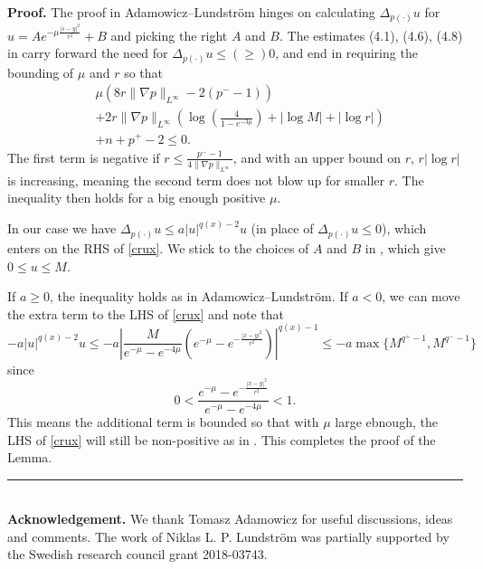 \documentclass[12pt]{article}
\newenvironment{proof}[1][Proof]{\textbf{#1.} }{\ \rule{0.5em}{0.5em}}
\numberwithin{komcounter}{section}
\begin{document}
\noindent
\begin{proof}
The proof in Adamowicz--Lundstr\"om \cite[Lemma 4.1]{AL16} hinges on calculating $\Delta_{p(\cdot)} u$ for $u = A  e^{-\mu \frac{|s-y|^2}{r^2}} + B$ and picking the right $A$ and $B$. The estimates (4.1), (4.6), (4.8) in \cite{AL16} carry forward the need for $\Delta_{p(\cdot)} u \leq (\geq) 0$, and end in requiring the bounding of $\mu$ and $r$ so that
%
\begin{align}\label{crux}
\nonumber &\mu ( 8r\|\nabla p\|_{L^\infty} - 2(p^- - 1)) \\
&+ 2r \|\nabla p\|_{L^\infty} \left( \log \left( \frac{4}{1-e^{-3\mu}}\right)  + |\log M| + |\log r| \right) \\
\nonumber &+ n + p^+ - 2 \leq 0.
\end{align}
%
The first term is negative if $r \leq \frac{p^- - 1}{4\|\nabla p\|_{L^\infty}}$, and with an upper bound on $r$, $r |\log r|$ is increasing, meaning the second term does not blow up for smaller $r$. The inequality then holds for a big enough positive $\mu$.

In our case we have $\Delta_{p(\cdot)} u \leq a |u|^{q(x) - 2} u$  (in place of $\Delta_{p(\cdot)} u \leq 0$),
which enters on the RHS of \eqref{crux}.
We stick to the choices of $A$ and $B$ in \cite{AL16},
which give $0 \leq u \leq M$.

If $a \geq 0$, the inequality holds as in Adamowicz--Lundstr\"om.
%
If $a < 0$, we can move the extra term to the LHS of \eqref{crux} and note that
\[
-a |u|^{q(x)-2}u
\leq -a \left| \frac{M}{e^{-\mu} - e^{-4\mu}} (e^{-\mu} - e^{-\frac{|x-y|^2}{r^2}}) \right|^{q(x)-1}
\leq -a \max\{ M^{q^+-1}, M^{q^--1}\}
\]
since
\[
0 < \frac{e^{-\mu} - e^{-\frac{|x-y|^2}{r^2}}}{e^{-\mu} - e^{-4\mu}} < 1.
\]
This means the additional term is bounded so that with $\mu$ large ebnough, the LHS of \eqref{crux} will still be non-positive as in \cite{AL16}. This completes the proof of the Lemma.
\end{proof}\\

\noindent
{\bf Acknowledgement.} We thank Tomasz Adamowicz for useful discussions, ideas and comments.
 The work of Niklas L. P. Lundstr\"om was partially supported by the Swedish research council grant 2018-03743.


\end{document}
